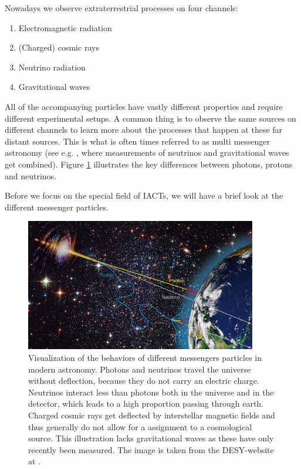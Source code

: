 Nowadays we observe extraterrestrial processes on four channels: 
\begin{enumerate}
	\item Electromagnetic radiation
	\item (Charged) cosmic rays
	\item Neutrino radiation
	\item Gravitational waves
\end{enumerate}

All of the accompanying particles have vastly different
properties and require different experimental setups.
A common thing is to observe the same sources 
on different channels to learn more about the processes that happen at 
these far distant sources. This is what is often times 
referred to as multi messenger astronomy (see e.g. \cite{RevModPhys.85.1401}, where
measurements of neutrinos and gravitational waves get combined).
Figure \ref{fig:multi_messenger} illustrates the key differences between
photons, protons and neutrinos.

Before we focus on the special field of IACTs, we will have
a brief look at the different messenger particles.

\begin{figure}
	\centering
	\captionsetup{width=0.9\linewidth}
	\includegraphics[width=0.9\textwidth]{images/astro-web-titel.jpg}
	\caption{Visualization of the behaviors of different messengers
		particles in modern astronomy.
		Photons and neutrinos travel the universe without deflection,
		because they do not carry an electric charge.
		Neutrinos interact less than photons both in the universe and in the detector,
		which leads to a high proportion passing through earth.
		Charged cosmic rays get deflected by interstellar
		magnetic fields and thus generally do not allow for a assignment to a cosmological source.
		This illustration lacks gravitational waves 
		as these have only recently been measured.
		The image is taken from the DESY-website at \cite{desy_mm_astro}.
	}
	\label{fig:multi_messenger}
\end{figure}


